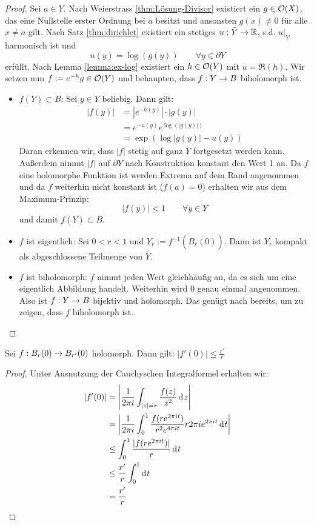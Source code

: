 \begin{proof}
  Sei $a \in Y$. Nach Weierstrass \ref{thm:Lösung-Divisor} existiert ein $g \in
  \mathcal{O}(X)$, das eine Nullstelle erster Ordnung bei $a$ besitzt und
  ansonsten $g(x) \neq 0$ für alle $x \neq a$ gilt. 
  Nach Satz \ref{thm:dirichlet} existiert ein stetiges $u: \bar Y \rightarrow
  \mathbb{R}$, s.d. $u|_Y$ harmonisch ist und
  \[
  u(y) = \log(g(y)) \qquad \forall y \in \partial Y
  \]
  erfüllt. 
  Nach Lemma \ref{lemma:ex-log} existiert ein $h \in \mathcal{O}(Y)$ mit $u =
  \Re(h)$. 
  Wir setzen nun $f := e^{-h} g \in \mathcal{O}(Y)$ und behaupten, dass $f: Y \rightarrow
  B$ biholomorph ist.
  \begin{itemize}
  \item $f(Y) \subset B$: Sei $y \in Y$ beliebig. Dann gilt:
    \begin{align*}
      |f(y)| & = | e^{-h(y)} | \cdot | g(y)| \\
      & = e^{-u(y)} e^{\log(|g(y)|)} \\
      & = \exp(\log|g(y)| - u(y))
    \end{align*}
    Daran erkennen wir, dass $|f|$ stetig auf ganz $\bar Y$ fortgesetzt werden
    kann. Außerdem nimmt $|f|$ auf $\partial Y$ nach Konstruktion konstant den Wert 1 an. Da
    $f$ eine holomorphe Funktion ist werden Extrema auf dem Rand
    angenommen und da $f$ weiterhin nicht konstant ist ($f(a) = 0$)
    erhalten wir aus dem Maximum-Prinzip:
    \[
    |f(y)| < 1 \qquad \forall y \in Y
    \]
    und damit $f(Y) \subset B$.
  \item $f$ ist eigentlich: Sei $0 < r < 1$ und $Y_r :=
    f^{-1}(\overline{B_r(0)})$. 
    Dann ist $Y_r$ kompakt als abgeschlossene Teilmenge von $\bar Y$.
  \item $f$ ist biholomorph: $f$ nimmt jeden Wert gleichhäufig an, da
    es sich um eine eigentlich Abbildung handelt. Weiterhin wird $0$
    genau einmal angenommen. Also ist $f: Y \rightarrow B$ bijektiv und
    holomorph. Das genügt nach \cite[Kor. 2.5]{For} bereits, um zu zeigen, dass $f$ biholomorph
    ist.

  \end{itemize}

\end{proof}

\begin{prop}
  \label{prop:kreis}
  Sei $f: B_r(0) \rightarrow B_{r'}(0)$ holomorph. Dann gilt: $|f'(0)| \leq \frac{r'}{r}$
\end{prop}

\begin{proof}
  Unter Ausnutzung der Cauchyschen Integralformel erhalten wir:
  \begin{align*}
    |f'(0)| & = \left | \frac{1}{2\pi i} \int_{|z| = r} \frac{f(z)}{z^2}
      \d[z] \right | \\
    & = \left | \frac{1}{2 \pi i} \int_0^1 \frac{f(r e^{2\pi it})}{r^2
        e^{4\pi i t}} r 2\pi i e^{2\pi i t} \d[t] \right | \\
    & \leq \int_0^1 \frac{|f(r e^{2\pi it})|}{r} \d[t] \\
    & \leq \frac{r'}{r} \int_0^1 \d[t] \\
    & = \frac{r'}{r}
  \end{align*}
\end{proof}


